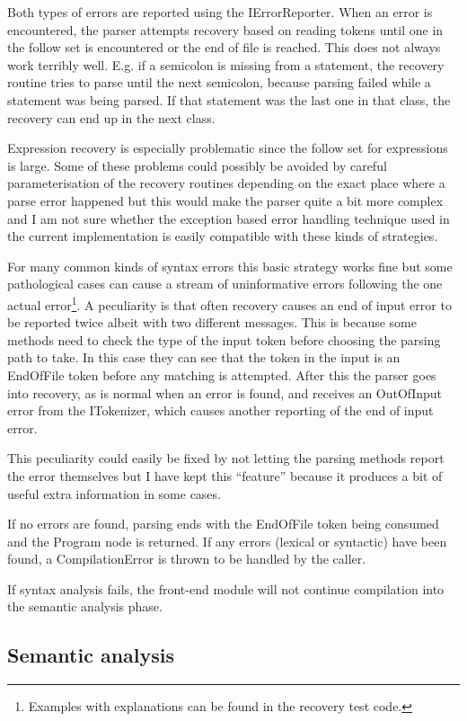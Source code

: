 \documentclass[a4paper,11pt]{article}
\begin{document}
Both types of errors are reported using the IErrorReporter. When an error is encountered, the parser attempts recovery based on reading tokens until one in the follow set is encountered or the end of file is reached. This does not always work terribly well. E.g. if a semicolon is missing from a statement, the recovery routine tries to parse until the next semicolon, because parsing failed while a statement was being parsed. If that statement was the last one in that class, the recovery can end up in the next class.

Expression recovery is especially problematic since the follow set for expressions is large. Some of these problems could possibly be avoided by careful parameterisation of the recovery routines depending on the exact place where a parse error happened but this would make the parser quite a bit more complex and I am not sure whether the exception based error handling technique used in the current implementation is easily compatible with these kinds of strategies.

For many common kinds of syntax errors this basic strategy works fine but some pathological cases can cause a stream of uninformative errors following the one actual error\footnote{Examples with explanations can be found in the recovery test code.}. A peculiarity is that often recovery causes an end of input error to be reported twice albeit with two different messages. This is because some methods need to check the type of the input token before choosing the parsing path to take. In this case they can see that the token in the input is an EndOfFile token before any matching is attempted. After this the parser goes into recovery, as is normal when an error is found, and receives an OutOfInput error from the ITokenizer, which causes another reporting of the end of input error.

This peculiarity could easily be fixed by not letting the parsing methods report the error themselves but I have kept this ``feature'' because it produces a bit of useful extra information in some cases.

If no errors are found, parsing ends with the EndOfFile token being consumed and the Program node is returned. If any errors (lexical or syntactic) have been found, a CompilationError is thrown to be handled by the caller.

If syntax analysis fails, the front-end module will not continue compilation into the semantic analysis phase.

\subsection{Semantic analysis}
\end{document}
